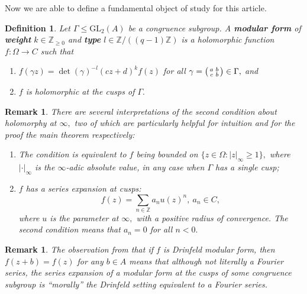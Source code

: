 \documentclass[11pt]{amsart}
\newtheorem{definition}[theorem]{Definition}
\newtheorem{remark}[theorem]{Remark}
\theoremstyle{definition}
\newenvironment{psmallmatrix}
{\left(\begin{smallmatrix}}
	{\end{smallmatrix}\right)}
\numberwithin{equation}{section}
\newcommand{\GL}{\mathrm{GL}} 	%
\newcommand{\bbZ}{\mathbb{Z}}		%
\begin{document}
		Now we are able to define a fundamental object of study for this article. 
		\begin{definition}\cite[Definition $(3.1)$]{Gekeler-Curves}
		\label{def: Drinfeld modular form}
			Let $\Gamma\leq \GL_2(A)$ be a congruence subgroup. A \textbf{modular form} of \textbf{weight} $k\in \bbZ_{\geq0}$ and \textbf{type} $l\in \bbZ/((q-1) \bbZ)$ is a holomorphic function $f:\Omega\to C$ such that 
			\begin{enumerate}
				\item $f(\gamma z)=\det(\gamma)^{-l}(cz+d)^kf(z)$ for all $\displaystyle{\gamma=\begin{psmallmatrix}a&b\\c&b\end{psmallmatrix}\in \Gamma},$ and
				\item $f$ is holomorphic at the cusps of $\Gamma.$
			\end{enumerate}
		\end{definition}
		
		\begin{remark}
			There are several interpretations of the second condition about holomorphy at $\infty,$ two of which are particularly helpful for intuition and for the proof the main theorem respectively:
			\begin{enumerate}
				\item \cite[$(2.2.\mathrm{iii})$]{Gekeler-Invariants} The condition is equivalent to $f$ being bounded on $\{z\in \Omega:|z|_{\infty}\geq 1\},$ where $|\cdot|_{\infty}$ is the $\infty$-adic absolute value, in any case when $\Gamma$ has a single cusp;
				\item \cite[Definition $3.5.(\mathrm{iii})$]{Gekeler-survey-Drinfeld-modular-forms} $f$ has a series expansion at cusps: 
				\[f(z)=\sum_{n\in \bbZ}a_nu(z)^n, ~a_n\in C,\]
				where $u$ is the parameter at $\infty,$ with a positive radius of convergence. The second condition means that $a_n=0$ for all $n<0.$
			\end{enumerate}
		\end{remark}
		
		\begin{remark}
			The observation from \cite[Definition $(5.7)$]{Gekeler-Coeff} that if $f$ is Drinfeld modular form, then $f(z+b)=f(z)$ for any $b\in A$ means that although not literally a Fourier series, the series expansion of a modular form at the cusps of some congruence subgroup is ``morally'' the Drinfeld setting equivalent to a Fourier series.   
		\end{remark}
		
\end{document}
